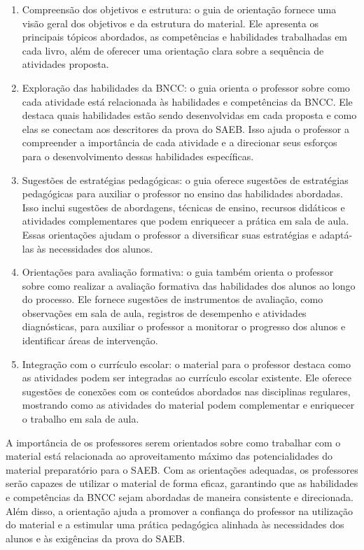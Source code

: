 \begin{enumerate}
\def\labelenumi{\arabic{enumi}.}
\item
  Compreensão dos objetivos e estrutura: o guia de orientação fornece
  uma visão geral dos objetivos e da estrutura do material. Ele
  apresenta os principais tópicos abordados, as competências e
  habilidades trabalhadas em cada livro, além de oferecer uma orientação
  clara sobre a sequência de atividades proposta.
\item
  Exploração das habilidades da BNCC: o guia orienta o professor sobre
  como cada atividade está relacionada às habilidades e competências da
  BNCC. Ele destaca quais habilidades estão sendo desenvolvidas em cada
  proposta e como elas se conectam aos descritores da prova do SAEB.
  Isso ajuda o professor a compreender a importância de cada atividade e
  a direcionar seus esforços para o desenvolvimento dessas habilidades
  específicas.
\item
  Sugestões de estratégias pedagógicas: o guia oferece sugestões de
  estratégias pedagógicas para auxiliar o professor no ensino das
  habilidades abordadas. Isso inclui sugestões de abordagens, técnicas
  de ensino, recursos didáticos e atividades complementares que podem
  enriquecer a prática em sala de aula. Essas orientações ajudam o
  professor a diversificar suas estratégias e adaptá-las às necessidades
  dos alunos.
\item
  Orientações para avaliação formativa: o guia também orienta o
  professor sobre como realizar a avaliação formativa das habilidades
  dos alunos ao longo do processo. Ele fornece sugestões de instrumentos
  de avaliação, como observações em sala de aula, registros de
  desempenho e atividades diagnósticas, para auxiliar o professor a
  monitorar o progresso dos alunos e identificar áreas de intervenção.
\item
  Integração com o currículo escolar: o material para o professor
  destaca como as atividades podem ser integradas ao currículo escolar
  existente. Ele oferece sugestões de conexões com os conteúdos
  abordados nas disciplinas regulares, mostrando como as atividades do
  material podem complementar e enriquecer o trabalho em sala de aula.
\end{enumerate}

A importância de os professores serem orientados sobre como trabalhar
com o material está relacionada ao aproveitamento máximo das
potencialidades do material preparatório para o SAEB. Com as orientações
adequadas, os professores serão capazes de utilizar o material de forma
eficaz, garantindo que as habilidades e competências da BNCC sejam
abordadas de maneira consistente e direcionada. Além disso, a orientação
ajuda a promover a confiança do professor na utilização do material e a
estimular uma prática pedagógica alinhada às necessidades dos alunos e
às exigências da prova do SAEB.

